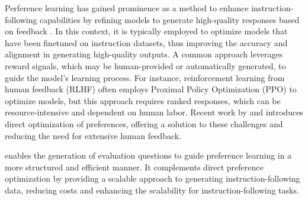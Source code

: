 Perference learning has gained prominence as a method to enhance instruction-following capabilities by refining models to generate high-quality responses based on feedback \citep{NEURIPS2022_b1efde53, dong2024self, sun2024conifer,gao2024unifiedviewpreferencelearning}. In this context, it is typically employed to optimize models that have been finetuned on instruction datasets, thus improving the accuracy and alignment in generating high-quality outputs. A common approach leverages reward signals, which may be human-provided or automatically generated, to guide the model's learning process. For instance, reinforcement learning from human feedback (RLHF) often employs Proximal Policy Optimization (PPO) to optimize models, but this approach requires ranked responses, which can be resource-intensive and dependent on human labor. Recent work by \citet{rafailov2024direct} and \citet{chen2024noise} introduces direct optimization of preferences, offering a solution to these challenges and reducing the need for extensive human feedback.

\method enables the generation of evaluation questions to guide preference learning in a more structured and efficient manner. It complements direct preference optimization by providing a scalable approach to generating instruction-following data, reducing costs and enhancing the scalability for instruction-following tasks.